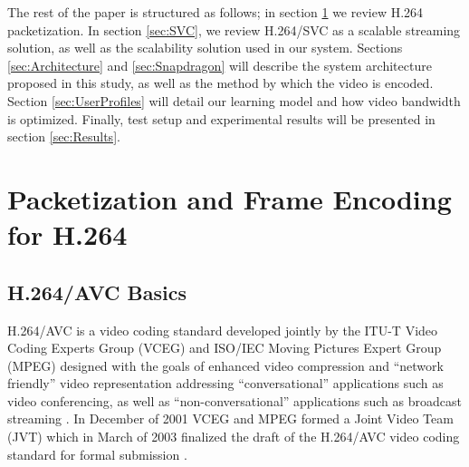 \documentclass[a4paper,12pt]{article}
\begin{document}
The rest of the paper is structured as follows; in section \ref{sec:Packetization} we review H.264 packetization. In section \ref{sec:SVC}, we review H.264/SVC as a scalable streaming solution, as well as the scalability solution used in our system. Sections \ref{sec:Architecture} and \ref{sec:Snapdragon} will describe the system architecture proposed in this study, as well as the method by which the video is encoded. Section \ref{sec:UserProfiles} will detail our learning model and how video bandwidth is optimized. Finally, test setup and experimental results will be presented in section \ref{sec:Results}.


\section{Packetization and Frame Encoding for H.264}
\label{sec:Packetization}

\subsection{H.264/AVC Basics}

H.264/AVC is a video coding standard developed jointly by the ITU-T Video Coding Experts Group (VCEG) and ISO/IEC Moving Pictures Expert Group (MPEG) designed with the goals of enhanced video compression and ``network friendly'' video representation addressing ``conversational'' applications such as video conferencing, as well as ``non-conversational'' applications such as broadcast streaming \cite{H264AVCOverview}. In December of 2001 VCEG and MPEG formed a Joint Video Team (JVT) which in March of 2003 finalized the draft of the H.264/AVC video coding standard for formal submission \cite{H264AVCOverview}. 
\end{document}
